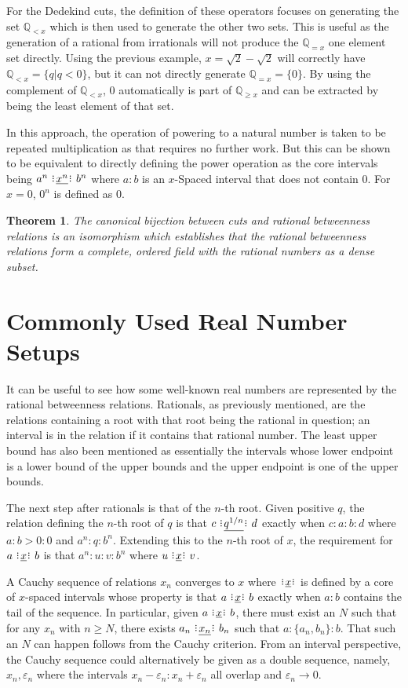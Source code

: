 \documentclass[12pt]{article}
\newtheorem{theorem}{Theorem}
\newcommand{\qcut}[2][x]{\ensuremath{\mathbb{Q}_{#2 #1}}}
\newcommand{\qlt}[1][x]{\qcut[#1]{<}}
\newcommand{\qeq}[1][x]{\qcut[#1]{=}}
\newcommand{\qgeq}[1][x]{\qcut[#1]{\geq}}
\begin{document}
For the Dedekind cuts, the definition of these operators focuses on generating the set $\qlt$ which is then used to generate the other two sets. This is useful as the generation of a rational from irrationals will not produce the $\qeq$ one element set directly. Using the previous example, $ x = \sqrt{2} - \sqrt{2}$ will correctly have $\qlt = \{ q | q < 0\}$, but it can not directly generate $\qeq = \{0\}$. By using the complement of $\qlt$, 0 automatically is part of $\qgeq$ and can be extracted by being the least element of that set.

In this approach, the operation of powering to a natural number is taken to be repeated multiplication as that requires no further work. But this can be shown to be equivalent to directly defining the power operation as the core intervals being $a^n \xrel[x^n] b^n$ where $a:b$ is an $x$-Spaced interval that does not contain 0. For $x = 0$, $0^n$ is defined as $0$. 


\begin{theorem}
The canonical bijection between cuts and rational betweenness relations is an isomorphism which establishes that the rational betweenness relations form a complete, ordered field with the rational numbers as a dense subset. 
\end{theorem}

\section{Commonly Used Real Number Setups}

It can be useful to see how some well-known real numbers are represented by the rational betweenness relations. Rationals, as previously mentioned, are the relations containing a root with that root being the rational in question; an interval is in the relation if it contains that rational number. The least upper bound has also been mentioned as essentially the intervals whose lower endpoint is a lower bound of the upper bounds and the upper endpoint is one of the upper bounds. 

The next step after rationals is that of the $n$-th root. Given positive $q$, the relation defining the $n$-th root of $q$ is that $c \xrel[q^{1/n}] d$ exactly when $c:a:b:d$ where $a:b > 0:0$ and  $a^n: q: b^n$. Extending this to the $n$-th root of $x$, the requirement for $a \xrel b$ is that $a^n:u:v:b^n$ where $u \xrel v$. 

A Cauchy sequence of relations $x_n$ converges to $x$ where $\xrel$ is defined by a core of $x$-spaced intervals whose property is that $a \xrel b$ exactly when $a:b$ contains the tail of the sequence. In particular, given $a\xrel b$, there must exist an $N$ such that for any $x_n$ with $n \geq N$, there exists $a_n \xrel[x_n] b_n$ such that $a:\{a_n, b_n\}:b$. That such an $N$ can happen follows from the Cauchy criterion. From an interval perspective, the Cauchy sequence could alternatively be given as a double sequence, namely, $x_n, \varepsilon_n$ where the intervals $x_n-\varepsilon_n : x_n + \varepsilon_n$  all overlap and $\varepsilon_n \to 0$. 
\end{document}
